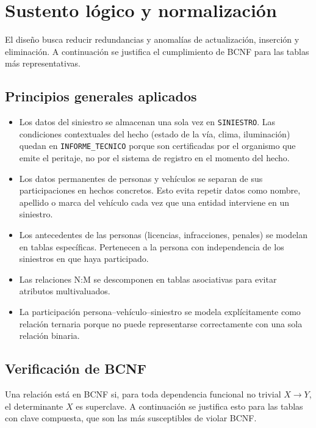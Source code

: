 \documentclass[12pt,a4paper]{article}
\begin{document}
\section{Sustento lógico y normalización}

El diseño busca reducir redundancias y anomalías de actualización, inserción y eliminación. A continuación se justifica el cumplimiento de BCNF para las tablas más representativas.

\subsection*{Principios generales aplicados}

\begin{itemize}[leftmargin=*]
    \item Los datos del siniestro se almacenan una sola vez en \texttt{SINIESTRO}. Las condiciones contextuales del hecho (estado de la vía, clima, iluminación) quedan en \texttt{INFORME\_TECNICO} porque son certificadas por el organismo que emite el peritaje, no por el sistema de registro en el momento del hecho.
    \item Los datos permanentes de personas y vehículos se separan de sus participaciones en hechos concretos. Esto evita repetir datos como nombre, apellido o marca del vehículo cada vez que una entidad interviene en un siniestro.
    \item Los antecedentes de las personas (licencias, infracciones, penales) se modelan en tablas específicas. Pertenecen a la persona con independencia de los siniestros en que haya participado.
    \item Las relaciones N:M se descomponen en tablas asociativas para evitar atributos multivaluados.
    \item La participación persona--vehículo--siniestro se modela explícitamente como relación ternaria porque no puede representarse correctamente con una sola relación binaria.
\end{itemize}

\subsection*{Verificación de BCNF}

Una relación está en BCNF si, para toda dependencia funcional no trivial $X \rightarrow Y$, el determinante $X$ es superclave. A continuación se justifica esto para las tablas con clave compuesta, que son las más susceptibles de violar BCNF.
\end{document}
